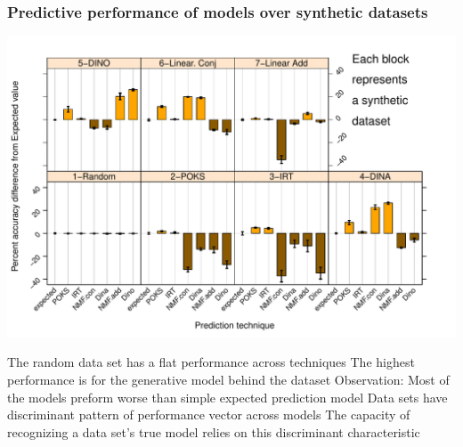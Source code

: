 \documentclass{beamer}
\begin{document}
\begin{frame}\frametitle{Predictive performance of models over synthetic datasets}
\vspace{-0.5cm}
\includegraphics[scale =0.45] {images/Syn}
\begin{overprint}
      The random data set has a flat performance across techniques 
       \small The highest performance is for the generative model behind the dataset
	  \onslide<3> Observation: Most of the models preform worse than simple expected prediction model %
	  \onslide<4> \small Data sets have discriminant pattern of performance vector across models
	  \onslide<5> The capacity of recognizing a data set’s true model relies on this discriminant characteristic
\end{overprint}
\end{frame}
\end{document}
